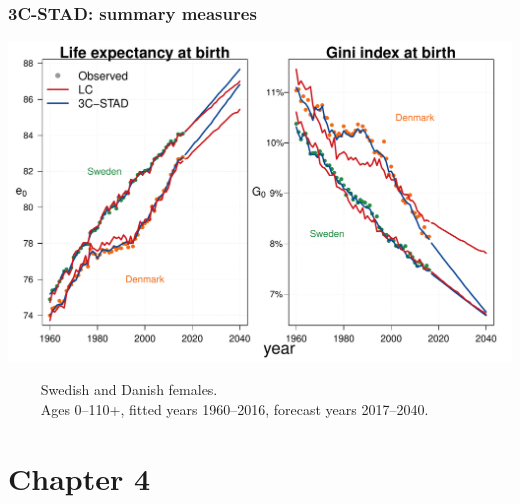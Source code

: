 \documentclass[12pt, xcolor=table]{beamer}  %
\begin{document}
\begin{frame}[noframenumbering]\frametitle{3C-STAD: summary measures}

\vspace{-0.5cm}
	
	\begin{center}	
		\vspace{0.4cm}
		
		\includegraphics[scale=.42]{Figures/Ch3/F4_3_new}
		
	\end{center}

\vspace{-0.3cm}
\tiny{$\quad\quad$ Swedish and Danish females. \\ $\quad\quad$ Ages 0--110+, fitted years 1960--2016, forecast years 2017--2040.}
	
\end{frame}

\section{Chapter 4}
\end{document}
